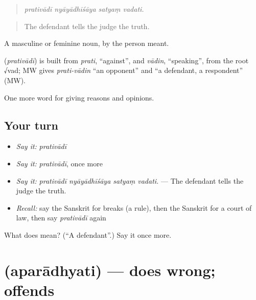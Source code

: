 \begin{quote}
   
\end{quote}

\begin{quote}
\emph{prativādī nyāyādhīśāya satyaṃ vadati.}
\end{quote}

\begin{quote}
The defendant tells the judge the truth.
\end{quote}

A masculine or feminine noun, by the person meant.

\begin{cousinweb}
\textbf{} (\emph{prativādī}) is built from \emph{prati}, \textquotedblleft{}against\textquotedblright{}, and \emph{vādin}, \textquotedblleft{}speaking\textquotedblright{}, from the root √vad; MW gives \emph{prati-vādin} \textquotedblleft{}an opponent\textquotedblright{} and \textquotedblleft{}a defendant, a respondent\textquotedblright{} (MW).
\end{cousinweb}

\begin{grammarlens}[title={What you've built}]
One more word for giving reasons and opinions.
\end{grammarlens}

\subsection*{Your turn}
\begin{itemize}
\raggedright
  \item \emph{Say it:} \emph{prativādī}
  \item \emph{Say it:} \emph{prativādī}, once more
  \item \emph{Say it:} \emph{prativādī nyāyādhīśāya satyaṃ vadati.} — The defendant tells the judge the truth.
  \item \emph{Recall:} say the Sanskrit for breaks (a rule), then the Sanskrit for a court of law, then say \emph{prativādī} again
\end{itemize}

\begin{tcolorbox}[breakable,colback=teal!4,colframe=teal!35!black,title={Before you move on}]
What does  mean? (\textquotedblleft{}A defendant\textquotedblright{}.) Say it once more.
\end{tcolorbox}
\section[\texorpdfstring{\sk{अपराध्यति} (aparādhyati)}{अपराध्यति (aparādhyati)}]{ (aparādhyati) — does wrong; offends}

